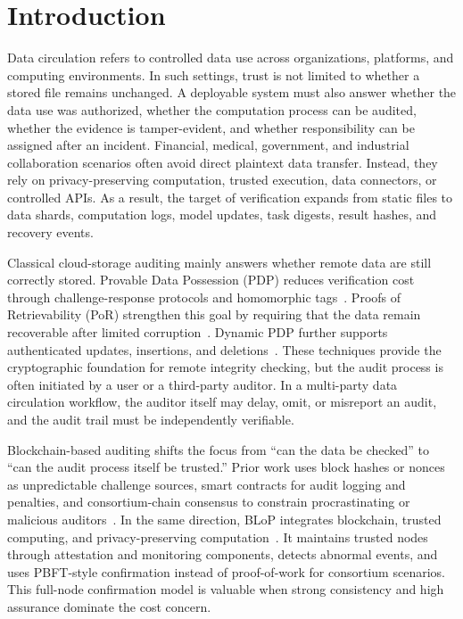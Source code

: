 \section{Introduction}

Data circulation refers to controlled data use across organizations, platforms, and computing environments. In such settings, trust is not limited to whether a stored file remains unchanged. A deployable system must also answer whether the data use was authorized, whether the computation process can be audited, whether the evidence is tamper-evident, and whether responsibility can be assigned after an incident. Financial, medical, government, and industrial collaboration scenarios often avoid direct plaintext data transfer. Instead, they rely on privacy-preserving computation, trusted execution, data connectors, or controlled APIs. As a result, the target of verification expands from static files to data shards, computation logs, model updates, task digests, result hashes, and recovery events.

Classical cloud-storage auditing mainly answers whether remote data are still correctly stored. Provable Data Possession (PDP) reduces verification cost through challenge-response protocols and homomorphic tags~\cite{ateniese_provable_2007}. Proofs of Retrievability (PoR) strengthen this goal by requiring that the data remain recoverable after limited corruption~\cite{juels_pors_2007,shacham_compact_2013}. Dynamic PDP further supports authenticated updates, insertions, and deletions~\cite{erway_dynamic_2015}. These techniques provide the cryptographic foundation for remote integrity checking, but the audit process is often initiated by a user or a third-party auditor. In a multi-party data circulation workflow, the auditor itself may delay, omit, or misreport an audit, and the audit trail must be independently verifiable.

Blockchain-based auditing shifts the focus from ``can the data be checked'' to ``can the audit process itself be trusted.'' Prior work uses block hashes or nonces as unpredictable challenge sources, smart contracts for audit logging and penalties, and consortium-chain consensus to constrain procrastinating or malicious auditors~\cite{xue_identity-based_2019,zhang_blockchain-based_2021,fan_dredas_2020,lin_consortium_2022}. In the same direction, BLoP integrates blockchain, trusted computing, and privacy-preserving computation~\cite{Zhang2025BloPAT}. It maintains trusted nodes through attestation and monitoring components, detects abnormal events, and uses PBFT-style confirmation instead of proof-of-work for consortium scenarios. This full-node confirmation model is valuable when strong consistency and high assurance dominate the cost concern.

